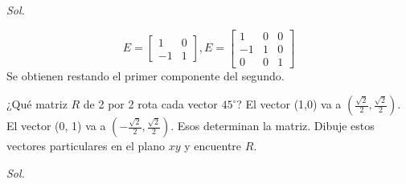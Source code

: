 \textit{ Sol. }

\begin{equation*}
	E= \begin{bmatrix} 1 & 0\\-1 & 1\end{bmatrix},E= \begin{bmatrix} 1 & 0&0\\-1 & 1&0 \\ 0&0&1 \end{bmatrix}
\end{equation*}
Se obtienen restando el primer componente del segundo.

\begin{problem}
¿Qué matriz $R$ de 2 por 2 rota cada vector $45^{\circ}$? El vector (1,0) va a
$(\frac{\sqrt{2}}{2}, \frac{\sqrt{2}}{2})$. El vector (0, 1) va a $(-\frac{\sqrt{2}}{2},\frac{\sqrt{2}}{2})$. Esos determinan la matriz. Dibuje estos vectores particulares en el plano $xy$ y encuentre $R$.
\end{problem}

\textit{ Sol. }

